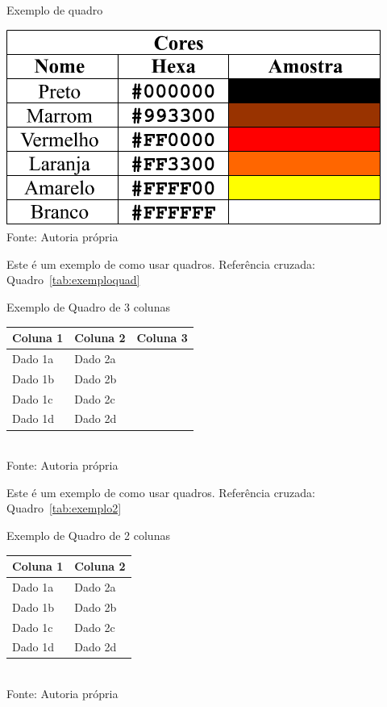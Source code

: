 \FloatBarrier
\begin{quadro}[!htbp]
	\centering
	\caption{Exemplo de quadro}
	\includegraphics[scale=.7]{imagens/exemploQuadro}
	\\Fonte: Autoria própria
	\label{qua:exemplo}
\end{quadro}
\FloatBarrier

Este é um exemplo de como usar quadros. Referência cruzada: Quadro~\ref{tab:exemploquad}

\FloatBarrier
\begin{quadro}[!htbp]
\centering
\caption{Exemplo de Quadro de 3 colunas}
	\begin{tabular}{ | m{10em} | m{4cm}| m{4cm} | }
		\hline
		\textbf{Coluna 1} & \textbf{Coluna 2} & \textbf{Coluna 3} \\ \hline
		Dado 1a           & Dado 2a & \\ \hline
		Dado 1b           & Dado 2b & \\ \hline
		Dado 1c           & Dado 2c & \\ \hline
		Dado 1d           & Dado 2d & \\ \hline
	\end{tabular}
	\\ \vspace{0.2cm}
	Fonte: Autoria própria
	\label{tab:exemploquad}
\end{quadro}
\FloatBarrier

Este é um exemplo de como usar quadros. Referência cruzada: Quadro~\ref{tab:exemplo2}

\FloatBarrier
\begin{quadro}[!htbp]
\centering
\caption{Exemplo de Quadro de 2 colunas}
	\begin{tabular}{ | m{10em} | m{4cm}| }
		\hline
		\textbf{Coluna 1} & \textbf{Coluna 2}  \\ \hline
		Dado 1a           & Dado 2a  \\ \hline
		Dado 1b           & Dado 2b  \\ \hline
		Dado 1c           & Dado 2c  \\ \hline
		Dado 1d           & Dado 2d  \\ \hline
	\end{tabular}
	\\ \vspace{0.2cm}
	Fonte: Autoria própria
	\label{tab:exemplo2}
\end{quadro}
\FloatBarrier

